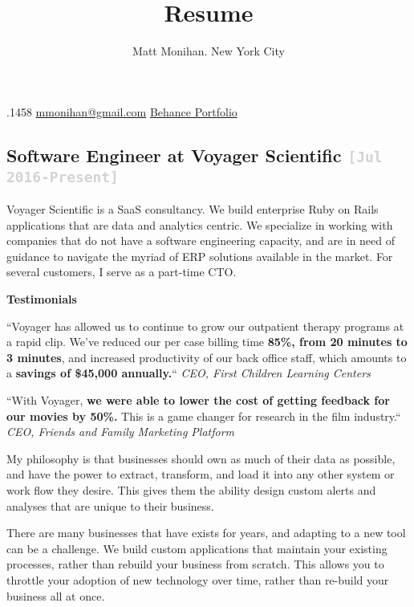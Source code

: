 \documentclass{tufte-handout}
\title{Resume}
\author{Matt Monihan. New York City}
\date{} %
\newcommand{\shstandout}[1]{\textbf{\textcolor{BurntOrange}{#1}}}
\newcommand{\shyears}[1]{\small{\texttt{\textcolor{LightGray}{#1}}}}
\begin{document}
.1458
\href{mailto:mmonihan@gmail.com}{mmonihan@gmail.com} \href{https://www.behance.net/mattmonihan}{Behance Portfolio}

\subsection{\textbf{Software Engineer} at \shstandout{Voyager Scientific} \shyears{[Jul 2016-Present]}}

Voyager Scientific is a SaaS consultancy. We build enterprise Ruby on Rails applications that are data and analytics centric. We specialize in working with companies that do not have a software engineering capacity, and are in need of guidance to navigate the myriad of ERP solutions available in the market. For several customers, I serve as a part-time CTO.

\begin{marginfigure}%
\textbf{Testimonials}
\end{marginfigure}

\begin{marginfigure}%
``Voyager has allowed us to continue to grow our outpatient therapy programs at a rapid clip. We've reduced our per case billing time \textbf{85\%, from 20 minutes to 3 minutes}, and increased productivity of our back office staff, which amounts to a \textbf{savings of \$45,000 annually.}``
\textit{CEO, First Children Learning Centers}
\end{marginfigure}

\begin{marginfigure}%
``With Voyager, \textbf{we were able to lower the cost of getting feedback for our movies by 50\%.} This is a game changer for research in the film industry.``
\textit{CEO, Friends and Family Marketing Platform}
\end{marginfigure}

My philosophy is that businesses should own as much of their data as possible, and have the power to extract, transform, and load it into any other system or work flow they desire. This gives them the ability design custom alerts and analyses that are unique to their business.

There are many businesses that have exists for years, and adapting to a new tool can be a challenge. We build custom applications that maintain your existing processes, rather than rebuild your business from scratch. This allows you to throttle your adoption of new technology over time, rather than re-build your business all at once.
\end{document}
